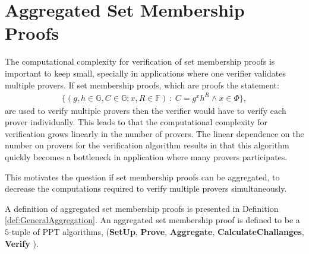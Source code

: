 \chapter{Aggregated Set Membership Proofs}
\label{ch:generalAgg}
The computational complexity for verification of set membership proofs is important to keep small, specially in applications where one verifier validates multiple provers. If set membership proofs, which are proofs the statement:
\begin{align*}
    \{(g,h\in\mathds{G},C\in\mathds{G};x,R\in\mathds{F})\::\:C= g^x h^R \wedge x \in \Phi\},
\end{align*}
are used to verify multiple provers then the verifier would have to verify each prover individually. This leads to that the computational complexity for verification grows linearly in the number of provers. The linear dependence on the number on provers for the verification algorithm results in that this algorithm quickly becomes a bottleneck in application where many provers participates. 

This motivates the question if set membership proofs can be aggregated, to decrease the computations required to verify multiple provers simultaneously. 

A definition of aggregated set membership proofs is presented  in Definition \ref{def:GeneralAggregation}. An aggregated set membership proof is defined to be a  $5$-tuple of PPT algorithms,  (\textbf{SetUp}, \textbf{Prove}, \textbf{Aggregate}, \textbf{CalculateChallanges}, \textbf{Verify} ).


